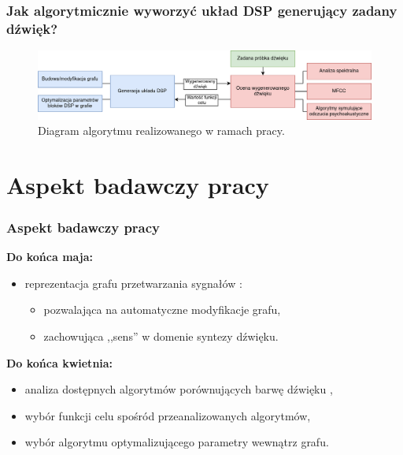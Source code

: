\documentclass[]{beamer}
\begin{document}
\begin{frame}
  \frametitle{Jak algorytmicznie wyworzyć układ DSP generujący zadany dźwięk?}

  \begin{figure}
    \centering
    \includegraphics[width=1.0\linewidth]{algorithm-diagram.png}
    \caption{Diagram algorytmu realizowanego w ramach pracy.}
  \end{figure}
\end{frame}


\section{Aspekt badawczy pracy}
\begin{frame}
  \frametitle{Aspekt badawczy pracy}
  
  \textbf{Do końca maja:}
  \begin{itemize}
    \item reprezentacja grafu przetwarzania sygnałów \cite{puredata}:
      \begin{itemize}
        \item pozwalająca na automatyczne modyfikacje grafu,
        \item zachowująca ,,sens'' w domenie syntezy dźwięku.
      \end{itemize}
  \end{itemize}

  \textbf{Do końca kwietnia:}
  \begin{itemize}
    \item analiza dostępnych algorytmów porównujących barwę dźwięku \cite{music_identification} \cite{sliding_fourier} \cite{ddx7},
    \item wybór funkcji celu spośród przeanalizowanych algorytmów,
    \item wybór algorytmu optymalizującego parametry wewnątrz grafu.
  \end{itemize}

\end{frame}
\end{document}
